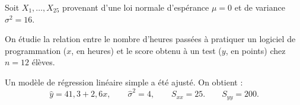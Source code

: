 \begin{questions}
\pageblanche
\question Soit $X_1,\hdots,X_{25}$ provenant d'une loi normale d'espérance $\mu=0$ et de variance $\sigma^2=16$.


\pageblanche





\pageblanche

\question\label{rls}

On étudie la relation entre le nombre d'heures passées à pratiquer un logiciel de programmation
($x$, en heures) et le score obtenu à un test ($y$, en points) chez $n=12$ élèves.

Un modèle de régression linéaire simple a été ajusté. On obtient :
$$
\hat y = 41{,}3 + 2{,}6x,
\qquad
\hat\sigma^2 = 4,
\qquad
S_{xx}=25.
\qquad S_{yy}=200.
$$



\end{questions}
